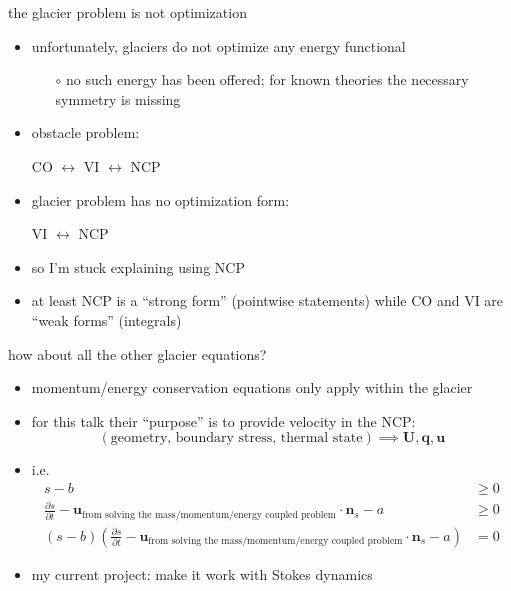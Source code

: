 \documentclass[10pt,hyperref,dvipsnames]{beamer}
\newcommand{\bn}{\mathbf{n}}
\newcommand{\bq}{\mathbf{q}}
\newcommand{\bu}{\mathbf{u}}
\newcommand{\bU}{\mathbf{U}}
\begin{document}
\begin{frame}{the glacier problem is not optimization}

\begin{itemize}
\item unfortunately, glaciers do not optimize any energy functional
    \begin{itemize}
    \item[$\circ$] no such energy has been offered; for known theories the necessary symmetry is missing
    \end{itemize}

\medskip
\item obstacle problem:

\medskip
\hspace{20mm} CO $\leftrightarrow$ VI $\leftrightarrow$ NCP

\smallskip
\item glacier problem has no optimization form:

\smallskip
\hspace{20mm} \phantom{CO $\leftrightarrow$} VI $\leftrightarrow$ NCP

\medskip
\item so I'm stuck explaining using NCP
\item at least NCP is a ``strong form'' (pointwise statements) while CO and VI are ``weak forms'' (integrals)
\end{itemize}
\end{frame}


\begin{frame}{how about all the other glacier equations?}
\begin{itemize}
\item momentum/energy conservation equations only apply within the glacier
\item for this talk their ``purpose'' is to provide velocity in the NCP:
    $$(\text{geometry, boundary stress, thermal state}) \implies \bU,\bq,\bu$$
\item i.e.
\begin{align*}
s-b &\ge 0 \\
\frac{\partial s}{\partial t} - \bu_{\text{from solving the mass/momentum/energy coupled problem}} \cdot \bn_s - a &\ge 0 \\
(s-b) \left(\frac{\partial s}{\partial t} - \bu_{\text{from solving the mass/momentum/energy coupled problem}} \cdot \bn_s - a\right) &= 0
\end{align*}
\item my current project: make it work with Stokes dynamics
\end{itemize}
\end{frame}
\end{document}
